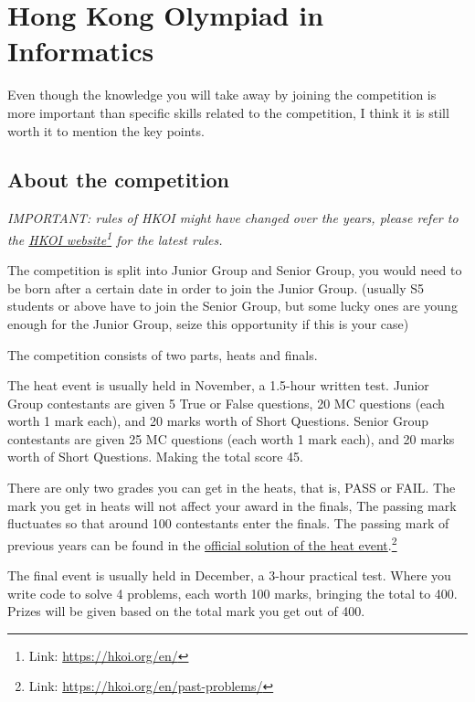 \chapter*{Hong Kong Olympiad in Informatics}

Even though the knowledge you will take away by joining the competition is more important than specific skills related to the competition, I think it is still worth it to mention the key points.

\section{About the competition}
\textit{IMPORTANT: rules of HKOI might have changed over the years, please refer to the \href{https://hkoi.org/en/}{HKOI website}\footnote{Link: \href{https://hkoi.org/en/}{https://hkoi.org/en/}} for the latest rules.}
\vspace{6mm}

The competition is split into Junior Group and Senior Group, you would need to be born after a certain date in order to join the Junior Group. (usually S5 students or above have to join the Senior Group, but some lucky ones are young enough for the Junior Group, seize this opportunity if this is your case)
\vspace{6mm}

The competition consists of two parts, heats and finals.
\vspace{6mm}

The heat event is usually held in November, a 1.5-hour written test. Junior Group contestants are given 5 True or False questions, 20 MC questions (each worth 1 mark each), and 20 marks worth of Short Questions. Senior Group contestants are given 25 MC questions (each worth 1 mark each), and 20 marks worth of Short Questions. Making the total score 45. 

There are only two grades you can get in the heats, that is, PASS or FAIL. The mark you get in heats will not affect your award in the finals, The passing mark fluctuates so that around 100 contestants enter the finals. The passing mark of previous years can be found in the \href{https://hkoi.org/en/past-problems/}{official solution of the heat event}.\footnote{Link: \href{https://hkoi.org/en/past-problems/}{https://hkoi.org/en/past-problems/}}
\vspace{6mm}

The final event is usually held in December, a 3-hour practical test. Where you write code to solve 4 problems, each worth 100 marks, bringing the total to 400. Prizes will be given based on the total mark you get out of 400.
\vspace{6mm}

